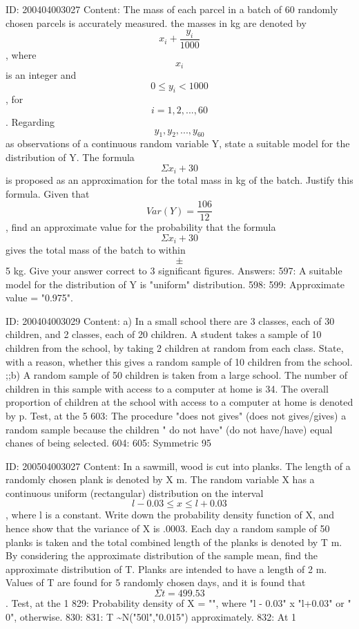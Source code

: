 \documentclass{article}
\begin{document}
ID: 200404003027
Content:
The mass of each parcel in a batch of 60 randomly chosen parcels is accurately measured. the masses in kg are denoted by $$x_i + \frac{y_i}{1000}$$, where $$x_i$$ is an integer and $$0 \leq y_i < 1000$$, for $$i=1,2,...,60$$. Regarding $$y_1, y_2,...,y_{60}$$ as observations of a continuous random variable Y, state a suitable model for the distribution of Y. The formula $$\Sigma x_i +30$$ is proposed as an approximation for the total mass in kg of the batch. Justify this formula. Given that $$Var(Y) = \frac{106}{12}$$, find an approximate value for the probability that the formula $$\Sigma x_i+30$$ gives the total mass of the batch to within $$\pm$$ 5 kg. Give your answer correct to 3 significant figures. Answers:
597: A suitable model for the distribution of Y is "uniform" distribution.
598: 
599: Approximate value = "0.975".

ID: 200404003029
Content:
a) In a small school there are 3 classes, each of 30 children, and 2 classes, each of 20 children. A student takes a sample of 10 children from the school, by taking 2 children at random from each class. State, with a reason, whether this gives a random sample of 10 children from the school. ;;b) A random sample of 50 children is taken from a large school. The number of children in this sample with access to a computer at home is 34. The overall proportion of children at the school with access to a computer at home is denoted by p. Test, at the 5%
603: The procedure "does not gives" (does not gives/gives) a random sample because the children " do not have" (do not have/have) equal chanes of being selected.
604: 
605: Symmetric 95%

ID: 200504003027
Content:
In a sawmill, wood is cut into planks. The length of a randomly chosen plank is denoted by X m. The random variable X has a continuous uniform (rectangular) distribution on the interval $$l - 0.03 \leq x \leq l + 0.03$$, where l is a constant. Write down the probability density function of X, and hence show that the variance of X is .0003. Each day a random sample of 50 planks is taken and the total combined length of the planks is denoted by T m. By considering the approximate distribution of the sample mean, find the approximate distribution of T. Planks are intended to have a length of 2 m. Values of T are found for 5 randomly chosen days, and it is found that $$\Sigma t = 499.53$$. Test, at the 1%
829: Probability density of X = "", where "l - 0.03" \leq x \leq "l+0.03" or " 0", otherwise.
830: 
831: T \sim N("50l","0.015") approximately.
832: At 1%
\end{document}
